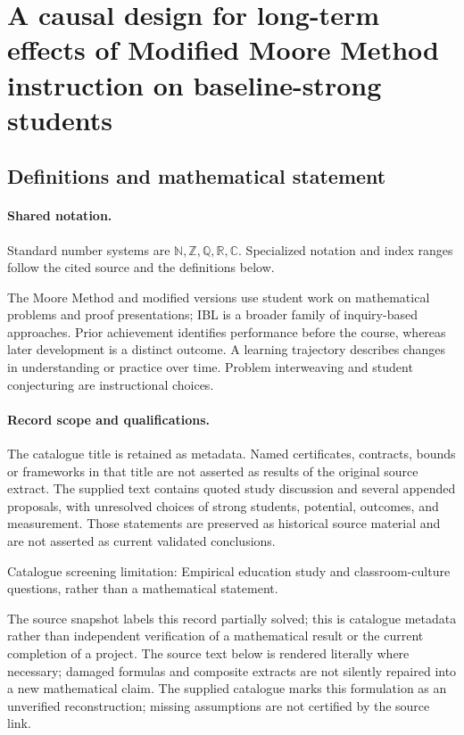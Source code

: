 \documentclass[11pt]{article}
\begin{document}
\section{A causal design for long-term effects of Modified Moore Method instruction on baseline-strong students}\label{statement}

\subsection{Definitions and mathematical statement}

\paragraph{Shared notation.}Standard number systems are $\mathbb N,\mathbb Z,\mathbb Q,\mathbb R,\mathbb C$. Specialized notation and index ranges follow the cited source and the definitions below.


The Moore Method and modified versions use student work on mathematical problems and proof presentations; IBL is a broader family of inquiry-based approaches. Prior achievement identifies performance before the course, whereas later development is a distinct outcome. A learning trajectory describes changes in understanding or practice over time. Problem interweaving and student conjecturing are instructional choices.
\paragraph{Record scope and qualifications.}
The catalogue title is retained as metadata. Named certificates, contracts, bounds or frameworks in that title are not asserted as results of the original source extract.
The supplied text contains quoted study discussion and several appended proposals, with unresolved choices of strong students, potential, outcomes, and measurement. Those statements are preserved as historical source material and are not asserted as current validated conclusions.

Catalogue screening limitation: Empirical education study and classroom-culture questions, rather than a mathematical statement.

The source snapshot labels this record partially solved; this is catalogue metadata rather than independent verification of a mathematical result or the current completion of a project.
The source text below is rendered literally where necessary; damaged formulas and composite extracts are not silently repaired into a new mathematical claim.
The supplied catalogue marks this formulation as an unverified reconstruction; missing assumptions are not certified by the source link.
\end{document}
